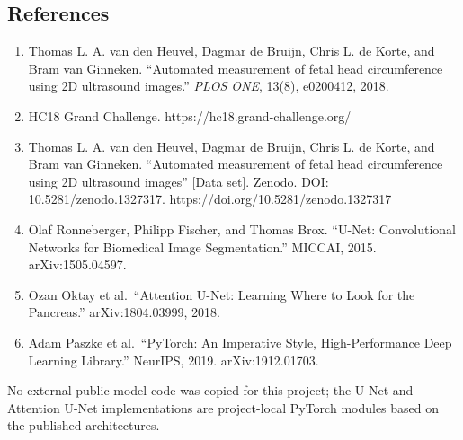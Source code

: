 \documentclass[
  10pt,
]{article}
\providecommand{\tightlist}{%
  \setlength{\itemsep}{0pt}\setlength{\parskip}{0pt}}
\begin{document}
\subsection{References}\label{references}

\begin{enumerate}
\def\labelenumi{\arabic{enumi}.}
\tightlist
\item
  Thomas L. A. van den Heuvel, Dagmar de Bruijn, Chris L. de Korte, and
  Bram van Ginneken. ``Automated measurement of fetal head circumference
  using 2D ultrasound images.'' \emph{PLOS ONE}, 13(8), e0200412, 2018.
\item
  HC18 Grand Challenge. https://hc18.grand-challenge.org/
\item
  Thomas L. A. van den Heuvel, Dagmar de Bruijn, Chris L. de Korte, and
  Bram van Ginneken. ``Automated measurement of fetal head circumference
  using 2D ultrasound images'' {[}Data set{]}. Zenodo. DOI:
  10.5281/zenodo.1327317. https://doi.org/10.5281/zenodo.1327317
\item
  Olaf Ronneberger, Philipp Fischer, and Thomas Brox. ``U-Net:
  Convolutional Networks for Biomedical Image Segmentation.'' MICCAI,
  2015. arXiv:1505.04597.
\item
  Ozan Oktay et al.~``Attention U-Net: Learning Where to Look for the
  Pancreas.'' arXiv:1804.03999, 2018.
\item
  Adam Paszke et al.~``PyTorch: An Imperative Style, High-Performance
  Deep Learning Library.'' NeurIPS, 2019. arXiv:1912.01703.
\end{enumerate}

No external public model code was copied for this project; the U-Net and
Attention U-Net implementations are project-local PyTorch modules based
on the published architectures.
\end{document}
